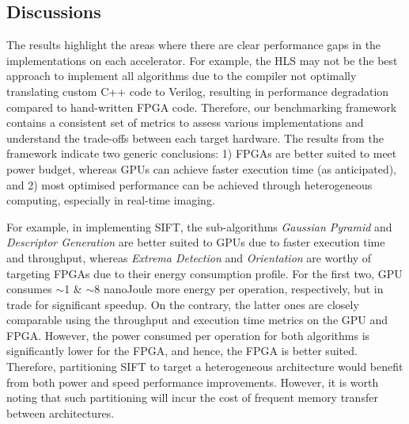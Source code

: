 

\subsection{Discussions}\label{sec:discussion}
The results highlight the areas where there are clear performance gaps in the implementations on each accelerator. For example, the HLS may not be the best approach to implement all algorithms due to the compiler not optimally translating custom C++ code to Verilog, resulting in performance degradation compared to hand-written FPGA code. Therefore, our benchmarking framework contains a consistent set of metrics to assess various implementations and understand the trade-offs between each target hardware. The results from the framework indicate two generic conclusions: 1) FPGAs are better suited to meet power budget, whereas GPUs can achieve faster execution time (as anticipated), and 2) most optimised performance can be achieved through heterogeneous computing, especially in real-time imaging. 

For example, in implementing SIFT, the sub-algorithms \textit{Gaussian Pyramid} and \textit{Descriptor Generation} are better suited to GPUs due to faster execution time and throughput, whereas \textit{Extrema Detection} and \textit{Orientation} are worthy of targeting FPGAs due to their energy consumption profile. For the first two, GPU consumes $\sim$1 \& $\sim$8 nanoJoule more energy per operation, respectively, but in trade for significant speedup. On the contrary, the latter ones are closely comparable using the throughput and execution time metrics on the GPU and FPGA. However, the power consumed per operation for both algorithms is significantly lower for the FPGA, and hence, the FPGA is better suited. Therefore, partitioning SIFT to target a heterogeneous architecture would benefit from both power and speed performance improvements. However, it is worth noting that such partitioning will incur the cost of frequent memory transfer between architectures.  

